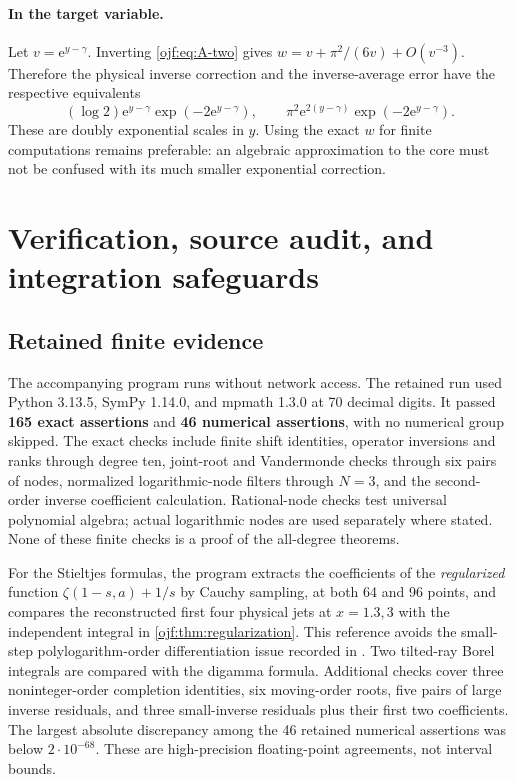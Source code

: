 \documentclass[11pt,a4paper]{article}
\numberwithin{equation}{section}
\theoremstyle{definition}\newtheorem{definition}[theorem]{Definition}
\theoremstyle{remark}\newtheorem{remark}[theorem]{Remark}
\newcommand{\ee}{\mathrm e}\newcommand{\ii}{\mathrm i}\newcommand{\dd}{\,\mathrm d}
\begin{document}
\paragraph{In the target variable.}
Let $v=\ee^{y-\gamma}$. Inverting \eqref{ojf:eq:A-two} gives
$w=v+\pi^2/(6v)+O(v^{-3})$. Therefore the physical inverse correction
and the inverse-average error have the respective equivalents
\begin{equation}\label{ojf:eq:double-exponential}
 (\log2)\ee^{y-\gamma}\exp(-2\ee^{y-\gamma}),\qquad
 \pi^2\ee^{2(y-\gamma)}\exp(-2\ee^{y-\gamma}).
\end{equation}
These are doubly exponential scales in $y$. Using the exact $w$ for
finite computations remains preferable: an algebraic approximation to
the core must not be confused with its much smaller exponential
correction.

\section{Verification, source audit, and integration safeguards}
\label{ojf:sec:verification}

\subsection{Retained finite evidence}
The accompanying program  runs without network
access. The retained run used Python 3.13.5, SymPy 1.14.0, and mpmath
1.3.0 at 70 decimal digits. It passed \textbf{165 exact assertions} and
\textbf{46 numerical assertions}, with no numerical group skipped.
The exact checks include finite shift identities, operator inversions
and ranks through degree ten, joint-root and Vandermonde checks through
six pairs of nodes, normalized logarithmic-node filters through $N=3$,
and the second-order inverse coefficient calculation. Rational-node
checks test universal polynomial algebra; actual logarithmic nodes are
used separately where stated. None of these finite checks is a proof of
the all-degree theorems.

For the Stieltjes formulas, the program extracts the coefficients of the
\emph{regularized} function $\zeta(1-s,a)+1/s$ by Cauchy sampling, at
both 64 and 96 points, and compares the reconstructed first four
physical jets at $x=1.3,3$ with the independent integral in
\cref{ojf:thm:regularization}. This reference avoids the small-step
polylogarithm-order differentiation issue recorded in
\cite{RepoResonant}. Two tilted-ray Borel integrals are compared with
the digamma formula. Additional checks cover three noninteger-order
completion identities, six moving-order roots, five pairs of large
inverse residuals, and three small-inverse residuals plus their first
two coefficients. The largest absolute discrepancy among the 46
retained numerical assertions was below $2\cdot10^{-68}$.
These are high-precision floating-point agreements, not interval bounds.
\end{document}
